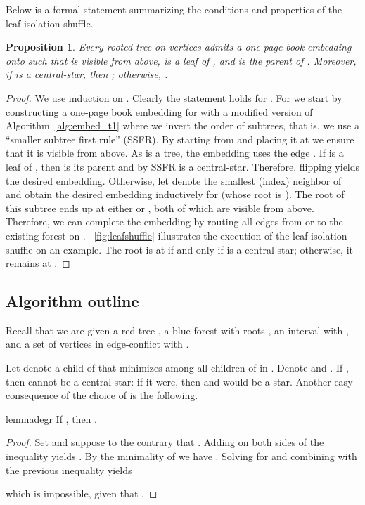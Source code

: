 \documentclass[11pt,a4paper,colorlinks=true,urlcolor=blue,citecolor=red]{article}
\theoremstyle{plain}
\newtheorem{proposition}[theorem]{Proposition}
\begin{document}
Below is a formal statement summarizing the conditions and properties of
the leaf-isolation shuffle.
\begin{proposition}\label{prop:leafshuffle}
  Every rooted tree  on  vertices admits a one-page book
  embedding onto  such that  is visible from
  above,  is a leaf  of , and  is the parent of
  . Moreover, if  is a central-star, then ; otherwise,
  .
\end{proposition}
\begin{proof}
  We use induction on . Clearly the statement holds for .
  For  we start by constructing a one-page book embedding for
   with a modified version of Algorithm~\ref{alg:embed_t1} where we
  invert the order of subtrees, that is, we use a ``smaller subtree
  first rule'' (SSFR). By starting from  and placing it at  we
  ensure that it is visible from above. As  is a tree, the embedding
  uses the edge . If  is a leaf of , then  is its
  parent and by SSFR  is a central-star. Therefore, flipping 
  yields the desired embedding. Otherwise, let 
  denote the smallest (index) neighbor of  and obtain the desired
  embedding inductively for  (whose root is ). The root of
  this subtree  ends up at either  or , both of which are
  visible from above. Therefore, we can complete the embedding by
  routing all edges from  or  to the existing forest on
  . \figurename~\ref{fig:leafshuffle} illustrates
  the execution of the leaf-isolation shuffle on an example. The root
   is at  if and only if  is a central-star; otherwise, it
  remains at .
\end{proof}

\subsection{Algorithm outline}\label{proofstart}

Recall that we are given a red tree , a blue forest  with
roots , an interval  with
, and a set  of vertices in edge-conflict with
.

Let  denote a child of  that minimizes  among all
children  of  in . Denote  and .
If , then  cannot be a central-star: if it were, then
 and  would be a star. Another easy consequence of the choice
of  is the following.
\begin{restatable}{lemma}{degr}\label{lem:degr}
  If , then .
\end{restatable}
\begin{proof}
  Set  and suppose to the contrary that
  . Adding  on both sides of the
  inequality yields . By the minimality of  we have
  . Solving for  and combining with the previous
  inequality yields
  
  which is impossible, given that .
\end{proof}
\end{document}
